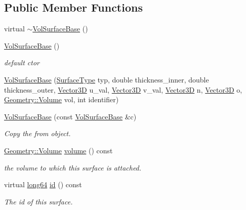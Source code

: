 \subsection*{Public Member Functions}
\begin{DoxyCompactItemize}
\item 
virtual \hyperlink{class_d_d4hep_1_1_d_d_rec_1_1_vol_surface_base_a675e603aff05bfb6f75fac1929f2b8df}{$\sim$\+Vol\+Surface\+Base} ()
\item 
\hyperlink{class_d_d4hep_1_1_d_d_rec_1_1_vol_surface_base_a837e93db1de913c7a7fccee261a59dd7}{Vol\+Surface\+Base} ()
\begin{DoxyCompactList}\small\item\em default c\textquotesingle{}tor \end{DoxyCompactList}\item 
\hyperlink{class_d_d4hep_1_1_d_d_rec_1_1_vol_surface_base_a2237eee6e8b307480cfd1d1ff91b534a}{Vol\+Surface\+Base} (\hyperlink{class_d_d_surfaces_1_1_surface_type}{Surface\+Type} typ, double thickness\+\_\+inner, double thickness\+\_\+outer, \hyperlink{class_d_d_surfaces_1_1_vector3_d}{Vector3D} u\+\_\+val, \hyperlink{class_d_d_surfaces_1_1_vector3_d}{Vector3D} v\+\_\+val, \hyperlink{class_d_d_surfaces_1_1_vector3_d}{Vector3D} n, \hyperlink{class_d_d_surfaces_1_1_vector3_d}{Vector3D} o, \hyperlink{class_d_d4hep_1_1_geometry_1_1_volume}{Geometry\+::\+Volume} vol, int identifier)
\item 
\hyperlink{class_d_d4hep_1_1_d_d_rec_1_1_vol_surface_base_ab23e50535b626ef54a322d4e85744c71}{Vol\+Surface\+Base} (const \hyperlink{class_d_d4hep_1_1_d_d_rec_1_1_vol_surface_base}{Vol\+Surface\+Base} \&c)
\begin{DoxyCompactList}\small\item\em Copy the from object. \end{DoxyCompactList}\item 
\hyperlink{class_d_d4hep_1_1_geometry_1_1_volume}{Geometry\+::\+Volume} \hyperlink{class_d_d4hep_1_1_d_d_rec_1_1_vol_surface_base_a05d942ec9e80220df74b76eb51bc35e9}{volume} () const
\begin{DoxyCompactList}\small\item\em the volume to which this surface is attached. \end{DoxyCompactList}\item 
virtual \hyperlink{namespace_d_d_surfaces_ab6b3da366f31f80aec56447ac4442e78}{long64} \hyperlink{class_d_d4hep_1_1_d_d_rec_1_1_vol_surface_base_a7b86431da7ec970cde28adfeade28427}{id} () const
\begin{DoxyCompactList}\small\item\em The id of this surface. \end{DoxyCompactList}\item 

\end{DoxyCompactItemize}
